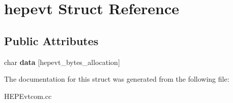 \hypertarget{structhepevt}{}\section{hepevt Struct Reference}
\label{structhepevt}
\subsection*{Public Attributes}
\begin{DoxyCompactItemize}
\item 
\hypertarget{structhepevt_aa52f667afe96b88afb75e90bba01c6dd}{}char {\bfseries data} \mbox{[}hepevt\+\_\+bytes\+\_\+allocation\mbox{]}\label{structhepevt_aa52f667afe96b88afb75e90bba01c6dd}

\end{DoxyCompactItemize}


The documentation for this struct was generated from the following file\+:\begin{DoxyCompactItemize}
\item 
H\+E\+P\+Evtcom.\+cc\end{DoxyCompactItemize}
